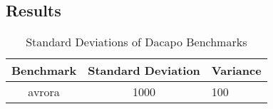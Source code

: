 \documentclass{sig-alternate}
\begin{document}
\subsection{Results}

%
%
\begin{table}
\centering
\caption{Standard Deviations of Dacapo Benchmarks}
\begin{tabular}{|c|c|l|} \hline
Benchmark&Standard Deviation&Variance\\ \hline
avrora &1000&100\\
\hline\end{tabular}
\end{table}


\end{document}
